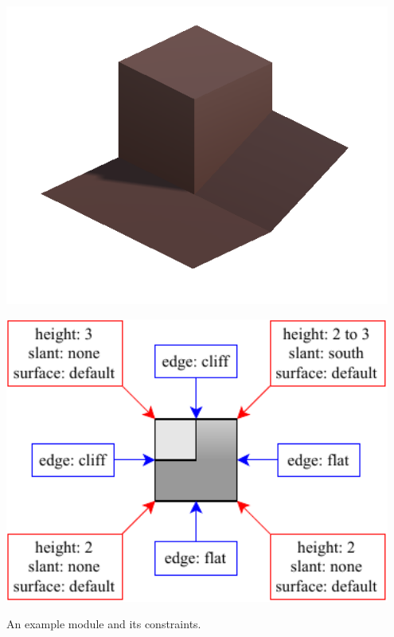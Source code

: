 \begin{center}
    \captionsetup{type=figure}
    \begin{minipage}{.5\textwidth}
        \centering
        \includegraphics[width=0.95\textwidth]{img/Module model.png}
    \end{minipage}%
    \begin{minipage}{.5\textwidth}
        \centering
        \includegraphics[width=0.95\textwidth]{img/Module constraints.pdf}
    \end{minipage}
    \caption{An example module and its constraints.}
    \label{fig:wfc-module}
\end{center}

